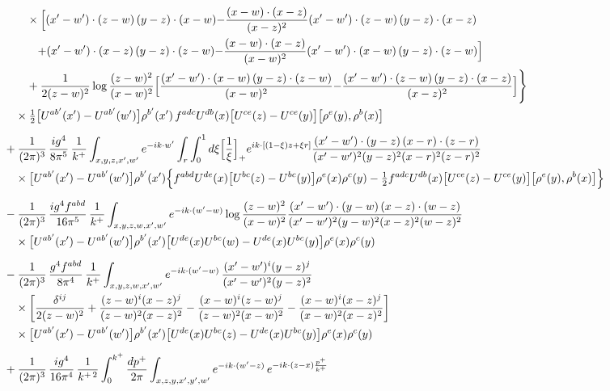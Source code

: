 \documentclass[9pt]{article}
\numberwithin{equation}{section}
\begin{document}
\begin{align}
&\qquad\times\Big[{(x'-w')\cdot(z-w)\,(y-z)\cdot(x-w)}{-\frac{(x-w)\cdot(x-z)}{(x-z)^{2}}(x'-w')\cdot(z-w)\,(y-z)\cdot(x-z)}\notag\\
&\qquad\quad{+(x'-w')\cdot(x-z)\,(y-z)\cdot(z-w)}{-\frac{(x-w)\cdot(x-z)}{(x-w)^{2}}(x'-w')\cdot(x-w)\,(y-z)\cdot(z-w)}\Big]\notag\\
&\qquad+\frac{1}{2(z-w)^{2}}\log\frac{(z-w)^{2}}{(x-w)^{2}}\Big[{\frac{(x'-w')\cdot(x-w)\,(y-z)\cdot(z-w)}{(x-w)^{2}}}{-\frac{(x'-w')\cdot(z-w)\,(y-z)\cdot(x-z)}{(x-z)^{2}}}\Big]\Bigg\}\notag\\
&\quad\times\tfrac12\big[U^{ab'}(x')-U^{ab'}(w')\big]\rho^{b'}(x')\,f^{adc}U^{db}(x)\big[U^{ce}(z)-U^{ce}(y)\big]\big[\rho^{e}(y),\rho^{b}(x)\big]\notag\\[6pt]
&+\frac{1}{(2\pi)^{3}}\,\frac{ig^{4}}{8\pi^{5}}\,\frac{1}{k^{+}}\int_{x,y,z,x',w'}e^{-ik\cdot w'}\int_{r}\int_{0}^{1}d\xi\Big[\frac1\xi\Big]_{+}e^{ik\cdot[(1-\xi)z+\xi r]}\frac{(x'-w')\cdot(y-z)\,(x-r)\cdot(z-r)}{(x'-w')^{2}(y-z)^{2}(x-r)^{2}(z-r)^{2}}\notag\\
&\quad\times\big[U^{ab'}(x')-U^{ab'}(w')\big]\rho^{b'}(x')\Big\{f^{abd}U^{de}(x)\big[U^{bc}(z)-U^{bc}(y)\big]\rho^{e}(x)\rho^{c}(y)-\tfrac12f^{adc}U^{db}(x)\big[U^{ce}(z)-U^{ce}(y)\big]\big[\rho^{e}(y),\rho^{b}(x)\big]\Big\}\notag\\[6pt]
&-\frac{1}{(2\pi)^{3}}\,\frac{ig^{4}f^{abd}}{16\pi^{5}}\,\frac{1}{k^{+}}\int_{x,y,z,w,x',w'}e^{-ik\cdot(w'-w)}\log\frac{(z-w)^{2}}{(x-w)^{2}}\frac{(x'-w')\cdot(y-w)\,(x-z)\cdot(w-z)}{(x'-w')^{2}(y-w)^{2}(x-z)^{2}(w-z)^{2}}\notag\\
&\quad\times\big[U^{ab'}(x')-U^{ab'}(w')\big]\rho^{b'}(x')\big[U^{de}(x)U^{bc}(w)-U^{de}(x)U^{bc}(y)\big]\rho^{e}(x)\rho^{c}(y)\notag\\[6pt]
&-\frac{1}{(2\pi)^{3}}\,\frac{g^{4}f^{abd}}{8\pi^{4}}\,\frac{1}{k^{+}}\int_{x,y,z,w,x',w'}e^{-ik\cdot(w'-w)}\,\frac{(x'-w')^{i}(y-z)^{j}}{(x'-w')^{2}(y-z)^{2}}\notag\\
&\quad\times\bigg[\frac{\delta^{ij}}{2(z-w)^{2}}+\frac{(z-w)^{i}(x-z)^{j}}{(z-w)^{2}(x-z)^{2}}-\frac{(x-w)^{i}(z-w)^{j}}{(z-w)^{2}(x-w)^{2}}-\frac{(x-w)^{i}(x-z)^{j}}{(x-w)^{2}(x-z)^{2}}\bigg]\notag\\
&\quad\times\big[U^{ab'}(x')-U^{ab'}(w')\big]\rho^{b'}(x')\big[U^{de}(x)U^{bc}(z)-U^{de}(x)U^{bc}(y)\big]\rho^{e}(x)\rho^{c}(y)\notag\\[6pt]
&+\frac{1}{(2\pi)^{3}}\,\frac{ig^{4}}{16\pi^{4}}\,\frac{1}{k^{+\,2}}\int_{0}^{k^{+}}\frac{dp^{+}}{2\pi}\int_{x,z,y,x',y',w'}e^{-ik\cdot(w'-z)}\,e^{-ik\cdot(z-x)\frac{p^{+}}{k^{+}}}\notag\\

\end{align}
\end{document}
